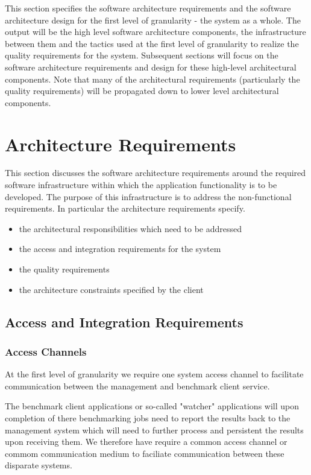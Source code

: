 This section specifies the software architecture requirements and the software architecture design
for the first level of granularity - the system as a whole. The output will be the high level software
architecture components, the infrastructure between them and the tactics used at the first level of
granularity to realize the quality requirements for the system.
Subsequent sections will focus on the software architecture requirements and design for these
high-level architectural components. Note that many of the architectural requirements (particularly
the quality requirements) will be propagated down to lower level architectural components.

\section{Architecture Requirements}
This section discusses the software architecture requirements around the 
required software infrastructure within which the application functionality is
to be developed. The purpose of this infrastructure is to address the
non-functional requirements. In particular the architecture requirements
specify.
\begin{itemize}
	\item the architectural responsibilities which need to be addressed
	\item the access and integration requirements for the system
	\item the quality requirements
	\item the architecture constraints specified by the client
\end{itemize}
\subsection{Access and Integration Requirements}
\subsubsection{Access Channels}
At the first level of granularity we require one system access channel to
facilitate communication between the management and benchmark client service.

The benchmark client applications or so-called "watcher" applications will upon
completion of there benchmarking jobs need to report the results back to the
management system which will need to further process and persistent the results
upon receiving them. We therefore have require a common access channel or
commom communication medium to faciliate communication between these disparate
systems.

